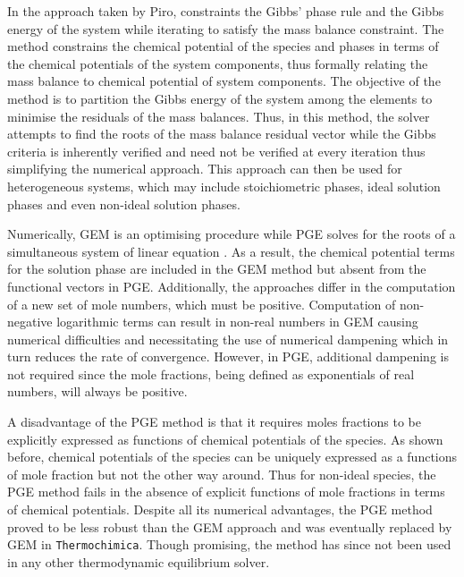 	In the approach taken by Piro, constraints the Gibbs' phase rule and the Gibbs energy of the system while iterating to satisfy the mass balance constraint. The method constrains the chemical potential of the species and phases in terms of the chemical potentials of the system components, thus formally relating the mass balance to chemical potential of system components. The objective of the method is to partition the Gibbs energy of the system among the elements to minimise the residuals of the mass balances. Thus, in this method, the solver attempts to find the roots of the mass balance residual vector while the Gibbs criteria is inherently verified and need not be verified at every iteration thus simplifying the numerical approach. This approach can then be used for heterogeneous systems, which may include stoichiometric phases, ideal solution phases and even non-ideal solution phases.

	Numerically, GEM is an optimising procedure while PGE solves for the roots of a simultaneous system of linear equation \cite{vanZeggeren11}. As a result, the chemical potential terms for the solution phase are included in the GEM method but absent from the functional vectors in PGE. Additionally, the approaches differ in the computation of a new set of mole numbers, which must be positive. Computation of non-negative logarithmic terms can result in non-real numbers in GEM causing numerical difficulties and necessitating the use of numerical dampening which in turn reduces the rate of convergence. However, in PGE, additional  dampening is not required since the mole fractions, being defined as exponentials of real numbers, will always be positive.

	A disadvantage of the PGE method is that it requires moles fractions to be explicitly expressed as functions of chemical potentials of the species. As shown before, chemical potentials of the species can be uniquely expressed as a functions of mole fraction but not the other way around. Thus for non-ideal species, the PGE method fails in the absence of explicit functions of mole fractions in terms of chemical potentials. Despite all its numerical advantages, the PGE method proved to be less robust than the GEM approach and was eventually replaced by GEM in \texttt{Thermochimica}. Though promising, the method has since not been used in any other thermodynamic equilibrium solver.

